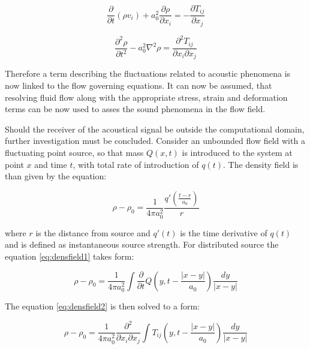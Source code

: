 \begin{equation} \label{eq:caacont5}
\frac{\partial}{\partial t} \left(\rho v_i \right) + a_0^2\frac{\partial \rho}{\partial x_i} = - \frac{\partial T_{ij}}{\partial x_j}
\end{equation}

\begin{equation} \label{eq:caacont6}
\frac{\partial^2 \rho}{\partial t^2} - a_0^2 \nabla^2 \rho = \frac{\partial^2 T_{ij}}{\partial x_i \partial x_j}
\end{equation}

Therefore a term describing the fluctuations related to acoustic phenomena is now linked to the flow governing equations. It can now be assumed, that resolving fluid flow along with the appropriate stress, strain and deformation terms can be now used to asses the sound phenomena in the flow field.

Should the receiver of the acoustical signal be outside the computational domain, further investigation must be concluded. Consider an unbounded flow field with a fluctuating point source, so that mass $Q(x, t)$ is introduced to the system at point $x$ and time $t$, with total rate of introduction of $q(t)$. The density field is than given by the equation:

\begin{equation} \label{eq:densfield1}
\rho - \rho_0 = \frac{1}{4 \pi a_0^2} \frac{q' \left( \frac{t-r}{a_0} \right)}{r}
\end{equation}

\noindent where $r$ is the distance from source and $q'(t)$ is the time derivative of $q(t)$ and is defined as instantaneous source strength. For distributed source the equation \ref{eq:densfield1} takes form:

\begin{equation} \label{eq:densfield2}
\rho - \rho_0 = \frac{1}{4 \pi a_0^2} \int \frac{\partial}{\partial t} Q \left(y, t - \frac{\lvert x-y \rvert}{a_0} \right) \frac{dy}{\lvert x-y \rvert}
\end{equation}

The equation \ref{eq:densfield2} is then solved to a form:

\begin{equation} \label{eq:denssolved}
\rho - \rho_0 = \frac{1}{4 \pi a_0^2} \frac{\partial^2}{\partial x_i \partial x_j}
\int T_{ij} \left(y, t - \frac{\lvert x-y \rvert}{a_0} \right) \frac{dy}{\lvert x-y \rvert}
\end{equation}

